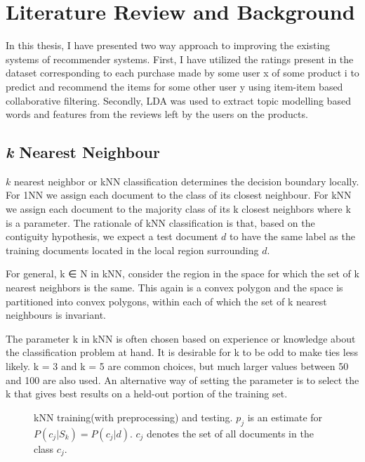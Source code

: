 \chapter{Literature Review and Background}

In this thesis, I have presented two way approach to improving the existing systems of recommender systems.
First, I have utilized the ratings present in the dataset corresponding to each purchase made by some user x of some product i to predict and recommend the items for some other user y using item-item based collaborative filtering. Secondly, LDA was used to extract topic modelling based words and features from the reviews left by the users on the products.

\section{\textit{k} Nearest Neighbour}
$k$ nearest neighbor or kNN classification determines the decision boundary locally. For 1NN we assign each document to the class of its closest neighbour. For kNN we assign each document to the majority class of its k closest neighbors where k is a parameter. The rationale of kNN classification is that, based on the contiguity hypothesis, we expect a test document $d$ to have the same label as the training documents located in the local region
surrounding $d$.

For general, k ∈ N in kNN, consider the region in the space for which the set of k nearest neighbors is the same. This again is a convex polygon and the space is partitioned into convex polygons, within each of which the set of k nearest neighbours is invariant.


The parameter k in kNN is often chosen based on experience or knowledge about the classification problem at hand.  It is desirable for k to be odd to make ties less likely. k = 3 and k = 5 are common choices, but much larger values between 50 and 100 are also used.  An alternative way of setting the parameter is to select the k that gives best results on a held-out portion of the training set.
\begin{figure}[H]
    {\par}
    \caption{kNN  training(with preprocessing) and testing. $p_{j}$ is an estimate for $P(c_{j}|S_{k}) = P(c_{j}|d)$. $c_{j}$ denotes the set of all documents in the class $c_{j}$.}
\end{figure}


